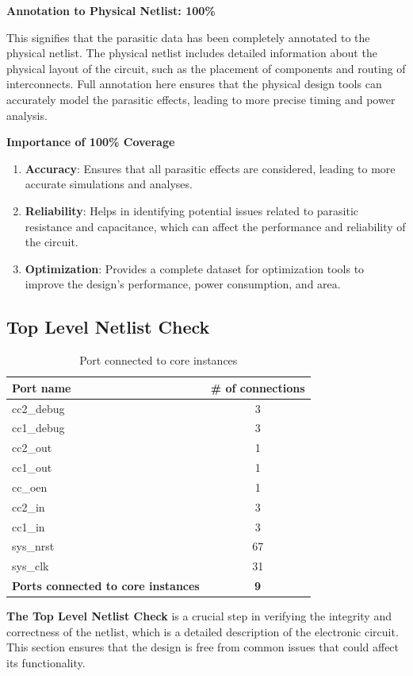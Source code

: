 \textbf{Annotation to Physical Netlist: 100\%}

This signifies that the parasitic data has been completely annotated to the physical netlist. The physical netlist includes detailed information about the physical layout of the circuit, such as the placement of components and routing of interconnects. Full annotation here ensures that the physical design tools can accurately model the parasitic effects, leading to more precise timing and power analysis.

\vspace{10pt}
\textbf{Importance of 100\% Coverage}

\begin{enumerate}
    \item \textbf{Accuracy}: Ensures that all parasitic effects are considered, leading to more accurate simulations and analyses.
    \item \textbf{Reliability}: Helps in identifying potential issues related to parasitic resistance and capacitance, which can affect the performance and reliability of the circuit.
    \item \textbf{Optimization}: Provides a complete dataset for optimization tools to improve the design’s performance, power consumption, and area.
\end{enumerate}

\subsection{Top Level Netlist Check}
\begin{table}[h]
    \centering
    \caption{Port connected to core instances}
    \begin{tabular}{|l|c|}
        \hline
        \textbf{Port name} & \textbf{\# of connections} \\
        \hline
        cc2\_debug & 3 \\
        cc1\_debug & 3 \\
        cc2\_out & 1 \\
        cc1\_out & 1 \\
        cc\_oen & 1 \\
        cc2\_in & 3 \\
        cc1\_in & 3 \\
        sys\_nrst & 67 \\
        sys\_clk & 31 \\
        \hline
        \textbf{Ports connected to core instances} & \textbf{9} \\
        \hline
    \end{tabular}
        \label{tab:port_connections}
\end{table}
\textbf{The Top Level Netlist Check} is a crucial step in verifying the integrity and correctness of the netlist, which is a detailed description of the electronic circuit. This section ensures that the design is free from common issues that could affect its functionality.

